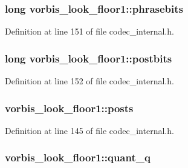 \subsubsection[{\texorpdfstring{phrasebits}{phrasebits}}]{\setlength{\rightskip}{0pt plus 5cm}long vorbis\+\_\+look\+\_\+floor1\+::phrasebits}\hypertarget{structvorbis__look__floor1_a10403077a7c2ffb6c8c1e94278621076}{}\label{structvorbis__look__floor1_a10403077a7c2ffb6c8c1e94278621076}


Definition at line 151 of file codec\+\_\+internal.\+h.

\subsubsection[{\texorpdfstring{postbits}{postbits}}]{\setlength{\rightskip}{0pt plus 5cm}long vorbis\+\_\+look\+\_\+floor1\+::postbits}\hypertarget{structvorbis__look__floor1_a0f1524a3ee7ca6d2e1aea806119a0c60}{}\label{structvorbis__look__floor1_a0f1524a3ee7ca6d2e1aea806119a0c60}


Definition at line 152 of file codec\+\_\+internal.\+h.

\subsubsection[{\texorpdfstring{posts}{posts}}]{ vorbis\+\_\+look\+\_\+floor1\+::posts}\hypertarget{structvorbis__look__floor1_ad6b1755af6760f3236c1f937c4c50edc}{}\label{structvorbis__look__floor1_ad6b1755af6760f3236c1f937c4c50edc}


Definition at line 145 of file codec\+\_\+internal.\+h.

\subsubsection[{\texorpdfstring{quant\+\_\+q}{quant_q}}]{ vorbis\+\_\+look\+\_\+floor1\+::quant\+\_\+q}\hypertarget{structvorbis__look__floor1_adac4ee5bff92d47ed24050b19c4cf01b}{}\label{structvorbis__look__floor1_adac4ee5bff92d47ed24050b19c4cf01b}


